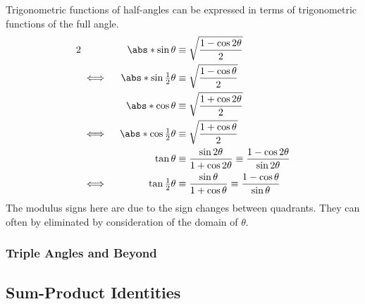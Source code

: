 \begin{theorem} \label{thm_trig_half_angle}
 Trigonometric functions of half-angles can be expressed in terms of
 trigonometric functions of the full angle.
 \begin{alignat*}2
  &&\abs*{\sin \theta} &\equiv
      \sqrt{\frac{1 - \cos 2 \theta} 2} \\
  &\iff{}& \abs*{\sin \tfrac 12 \theta} &\equiv
      \sqrt{\frac{1 - \cos \theta} 2} \\
  &&\abs*{\cos \theta} &\equiv
      \sqrt{\frac{1 + \cos 2 \theta} 2} \\
  &\iff{}& \abs*{\cos \tfrac 12 \theta} &\equiv
      \sqrt{\frac{1 + \cos \theta} 2} \\
  &&\tan \theta &\equiv
      \frac{\sin 2 \theta}{1 + \cos 2 \theta}
      \equiv \frac{1 - \cos 2 \theta}{\sin 2 \theta} \\
  &\iff{}& \tan \tfrac 12 \theta &\equiv
      \frac{\sin \theta}{1 + \cos \theta}
      \equiv \frac{1 - \cos \theta}{\sin \theta}
 \end{alignat*}
 The modulus signs here are due to the sign changes between quadrants. They can
 often by eliminated by consideration of the domain of \(\theta\).
\end{theorem}

\subsubsection{Triple Angles and Beyond}

\subsection{Sum-Product Identities} \label{sec_trig_sum_product}

